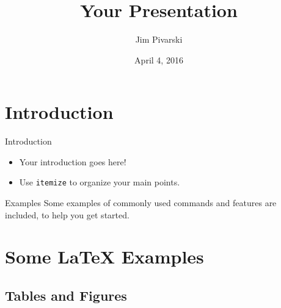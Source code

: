 \documentclass{beamer}
\title[2016-04-04-offline-pr-overview]{Your Presentation}
\author{Jim Pivarski}
\institute{Princeton University -- DIANA}
\date{April 4, 2016}
\begin{document}
\begin{frame}
  \titlepage
\end{frame}


\section{Introduction}

\begin{frame}{Introduction}

\begin{itemize}
  \item Your introduction goes here!
  \item Use \texttt{itemize} to organize your main points.
\end{itemize}

\vskip 1cm

\begin{block}{Examples}
Some examples of commonly used commands and features are included, to help you get started.
\end{block}

\end{frame}

\section{Some \LaTeX{} Examples}

\subsection{Tables and Figures}
\end{document}
